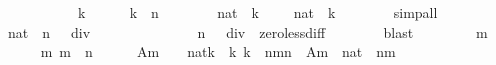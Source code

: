\begin{isabellebody}
\ \ \ \ \isamarkupfalse%
\isanewline
\ \ \isamarkupfalse%
\isanewline
\ \ \ \ \isamarkupfalse%
\ k\isanewline
\ \ \ \ \isamarkupfalse%
\ {\isachardoublequoteopen}k\ {\isasymin}\ {\isacharbraceleft}{}{\isachardot}{\isachardot}{\isacharless}n{\isacharbraceright}{\isachardoublequoteclose}\isanewline
\ \ \ \ \isamarkupfalse%
\ {\isachardoublequoteopen}{}\ {\isacharless}\ {\isacharparenleft}{}{\isacharcolon}{\isacharcolon}nat{\isacharparenright}\ {\isacharcircum}\ k{\isachardoublequoteclose}\ {\isachardoublequoteopen}{}\ {\isacharless}\ {}\ {\isacharasterisk}\ {\isacharparenleft}{}{\isacharcolon}{\isacharcolon}nat{\isacharparenright}\ {\isacharcircum}\ k{\isachardoublequoteclose}\isanewline
\ \ \ \ \ \ \isamarkupfalse%
\ simp{\isacharunderscore}all\isanewline
\ \ \isamarkupfalse%
\isanewline
\ \ \ \ \isamarkupfalse%
\ {\isachardoublequoteopen}{}\ {\isacharless}\ {\isacharparenleft}{\isacharparenleft}{}{\isacharcolon}{\isacharcolon}nat{\isacharparenright}\ {\isacharcircum}\ n\ {\isacharplus}\ {}{\isacharparenright}\ div\ {}\ {\isacharminus}\ {}{\isachardoublequoteclose}\isanewline
\ \ \ \ \ \ \isamarkupfalse%
\ {\isacartoucheopen}{}\ {\isacharless}\ {\isacharparenleft}{}\ {\isacharcircum}\ n\ {\isacharplus}\ {}{\isacharparenright}\ div\ {}{\isacartoucheclose}\ zero{\isacharunderscore}less{\isacharunderscore}diff\isanewline
\ \ \ \ \ \ \isamarkupfalse%
\ blast\isanewline
\ \ \isamarkupfalse%
\isanewline
\ \ \ \ \isamarkupfalse%
\ m\isanewline
\ \ \ \ \isamarkupfalse%
\ {\isachardoublequoteopen}{}\ {\isasymle}\ m{\isachardoublequoteclose}\ {\isachardoublequoteopen}m\ {\isasymle}\ n{\isachardoublequoteclose}\isanewline
\ \ \ \ \isamarkupfalse%
\ {\isacharquery}Am{\isacharprime}\ {\isacharequal}\ {\isachardoublequoteopen}{\isacharbraceleft}{}\ {\isacharasterisk}\ {\isacharparenleft}{}{\isacharcolon}{\isacharcolon}nat{\isacharparenright}{\isacharcircum}k\ {\isacharbar}\ k{\isachardot}\ k\ {\isasymin}\ {\isacharbraceleft}n{\isacharminus}m{\isacharplus}{}{\isachardot}{\isachardot}{\isacharless}n{\isacharbraceright}{\isacharbraceright}{\isachardoublequoteclose}\ \ {\isacharquery}Am{\isacharprime}{\isacharprime}\ {\isacharequal}\ {\isachardoublequoteopen}{\isacharbraceleft}{\isacharparenleft}{}{\isacharcolon}{\isacharcolon}nat{\isacharparenright}\ {\isacharcircum}\ {\isacharparenleft}n{\isacharminus}m{\isacharplus}{}{\isacharparenright}{\isacharbraceright}{\isachardoublequoteclose}\isanewline

\end{isabellebody}
